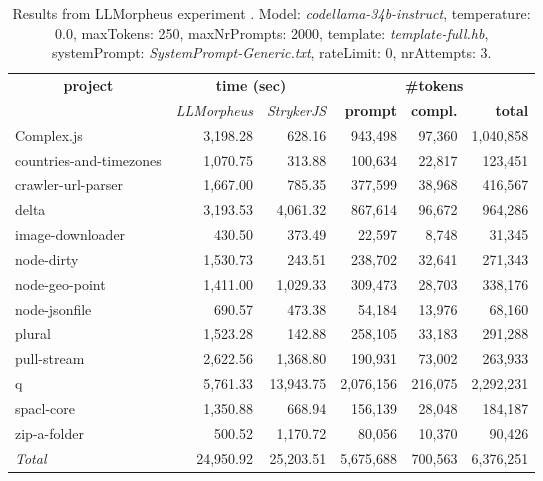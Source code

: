 
\begin{table*}[hbt!]
\centering
{\scriptsize
\begin{tabular}{l||r|r|r|r|r}
\multicolumn{1}{c|}{\bf project} & \multicolumn{2}{|c|}{\bf time (sec)} & \multicolumn{3}{|c|}{\bf \#tokens} \\
               & {\it LLMorpheus} & {\it StrykerJS} & {\bf prompt} & {\bf compl.} & {\bf total} \\
\hline
  Complex.js & 3,198.28 & 628.16 & 943,498 & 97,360 & 1,040,858 \\ 
countries-and-timezones & 1,070.75 & 313.88 & 100,634 & 22,817 & 123,451 \\ 
crawler-url-parser & 1,667.00 & 785.35 & 377,599 & 38,968 & 416,567 \\ 
delta & 3,193.53 & 4,061.32 & 867,614 & 96,672 & 964,286 \\ 
image-downloader & 430.50 & 373.49 & 22,597 & 8,748 & 31,345 \\ 
node-dirty & 1,530.73 & 243.51 & 238,702 & 32,641 & 271,343 \\ 
node-geo-point & 1,411.00 & 1,029.33 & 309,473 & 28,703 & 338,176 \\ 
node-jsonfile & 690.57 & 473.38 & 54,184 & 13,976 & 68,160 \\ 
plural & 1,523.28 & 142.88 & 258,105 & 33,183 & 291,288 \\ 
pull-stream & 2,622.56 & 1,368.80 & 190,931 & 73,002 & 263,933 \\ 
q & 5,761.33 & 13,943.75 & 2,076,156 & 216,075 & 2,292,231 \\ 
spacl-core & 1,350.88 & 668.94 & 156,139 & 28,048 & 184,187 \\ 
zip-a-folder & 500.52 & 1,170.72 & 80,056 & 10,370 & 90,426 \\ 
\hline
  \textit{Total} & 24,950.92 & 25,203.51 & 5,675,688 & 700,563 & 6,376,251 \\
  \end{tabular}
  }
  \\[2mm]
  \caption{Results from LLMorpheus experiment .
    Model: \textit{codellama-34b-instruct}, 
    temperature: 0.0, 
    maxTokens: 250, 
    maxNrPrompts: 2000, 
    template: \textit{template-full.hb}, 
    systemPrompt: \textit{SystemPrompt-Generic.txt}, 
    rateLimit: 0, 
    nrAttempts: 3.  
  }
  \label{table:Cost:run385:codellama-34b-instruct:template-full.hb:0.0}
\end{table*}